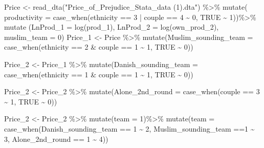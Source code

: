 \documentclass[
]{article}
\newenvironment{Shaded}{\begin{snugshade}}{\end{snugshade}}
\newcommand{\AttributeTok}[1]{\textcolor[rgb]{0.77,0.63,0.00}{#1}}
\newcommand{\ConstantTok}[1]{\textcolor[rgb]{0.00,0.00,0.00}{#1}}
\newcommand{\DecValTok}[1]{\textcolor[rgb]{0.00,0.00,0.81}{#1}}
\newcommand{\FunctionTok}[1]{\textcolor[rgb]{0.00,0.00,0.00}{#1}}
\newcommand{\NormalTok}[1]{#1}
\newcommand{\OtherTok}[1]{\textcolor[rgb]{0.56,0.35,0.01}{#1}}
\newcommand{\SpecialCharTok}[1]{\textcolor[rgb]{0.00,0.00,0.00}{#1}}
\newcommand{\StringTok}[1]{\textcolor[rgb]{0.31,0.60,0.02}{#1}}
\begin{document}
\begin{Shaded}
\begin{Highlighting}[]
\NormalTok{Price }\OtherTok{\textless{}{-}} \FunctionTok{read\_dta}\NormalTok{(}\StringTok{"Price\_of\_Prejudice\_Stata\_data (1).dta"}\NormalTok{) }\SpecialCharTok{\%\textgreater{}\%}
  \FunctionTok{mutate}\NormalTok{( }\AttributeTok{productivity =} \FunctionTok{case\_when}\NormalTok{(ethnicity }\SpecialCharTok{==} \DecValTok{3} \SpecialCharTok{|}\NormalTok{ couple }\SpecialCharTok{==} \DecValTok{4} \SpecialCharTok{\textasciitilde{}} \DecValTok{0}\NormalTok{, }\ConstantTok{TRUE} \SpecialCharTok{\textasciitilde{}} \DecValTok{1}\NormalTok{))}\SpecialCharTok{\%\textgreater{}\%}
  \FunctionTok{mutate}\NormalTok{ (}\AttributeTok{LnProd\_1 =} \FunctionTok{log}\NormalTok{(prod\_1),}
          \AttributeTok{LnProd\_2 =} \FunctionTok{log}\NormalTok{(own\_prod\_2),}
          \AttributeTok{muslim\_team =} \DecValTok{0}\NormalTok{)}
\NormalTok{Price\_1 }\OtherTok{\textless{}{-}}\NormalTok{ Price }\SpecialCharTok{\%\textgreater{}\%}
  \FunctionTok{mutate}\NormalTok{(}\AttributeTok{Muslim\_sounding\_team =} \FunctionTok{case\_when}\NormalTok{(ethnicity }\SpecialCharTok{==} \DecValTok{2} \SpecialCharTok{\&}\NormalTok{ couple }\SpecialCharTok{==} \DecValTok{1} \SpecialCharTok{\textasciitilde{}} \DecValTok{1}\NormalTok{, }\ConstantTok{TRUE} \SpecialCharTok{\textasciitilde{}} \DecValTok{0}\NormalTok{))}
    
\NormalTok{Price\_2 }\OtherTok{\textless{}{-}}\NormalTok{ Price\_1 }\SpecialCharTok{\%\textgreater{}\%}
  \FunctionTok{mutate}\NormalTok{(}\AttributeTok{Danish\_sounding\_team =} \FunctionTok{case\_when}\NormalTok{(ethnicity }\SpecialCharTok{==} \DecValTok{1} \SpecialCharTok{\&}\NormalTok{ couple }\SpecialCharTok{==} \DecValTok{1} \SpecialCharTok{\textasciitilde{}} \DecValTok{1}\NormalTok{, }\ConstantTok{TRUE} \SpecialCharTok{\textasciitilde{}} \DecValTok{0}\NormalTok{))}

\NormalTok{Price\_2 }\OtherTok{\textless{}{-}}\NormalTok{ Price\_2 }\SpecialCharTok{\%\textgreater{}\%}
  \FunctionTok{mutate}\NormalTok{(}\AttributeTok{Alone\_2nd\_round =} \FunctionTok{case\_when}\NormalTok{(couple }\SpecialCharTok{==} \DecValTok{3} \SpecialCharTok{\textasciitilde{}} \DecValTok{1}\NormalTok{, }\ConstantTok{TRUE} \SpecialCharTok{\textasciitilde{}} \DecValTok{0}\NormalTok{))}
         
\NormalTok{Price\_2 }\OtherTok{\textless{}{-}}\NormalTok{ Price\_2 }\SpecialCharTok{\%\textgreater{}\%}
  \FunctionTok{mutate}\NormalTok{(}\AttributeTok{team =} \DecValTok{1}\NormalTok{)}\SpecialCharTok{\%\textgreater{}\%}
  \FunctionTok{mutate}\NormalTok{(}\AttributeTok{team =} \FunctionTok{case\_when}\NormalTok{(Danish\_sounding\_team }\SpecialCharTok{==} \DecValTok{1} \SpecialCharTok{\textasciitilde{}} \DecValTok{2}\NormalTok{, Muslim\_sounding\_team }\SpecialCharTok{==}\DecValTok{1} \SpecialCharTok{\textasciitilde{}} \DecValTok{3}\NormalTok{, Alone\_2nd\_round }\SpecialCharTok{==} \DecValTok{1} \SpecialCharTok{\textasciitilde{}} \DecValTok{4}\NormalTok{))}


\end{Highlighting}
\end{Shaded}
\end{document}
